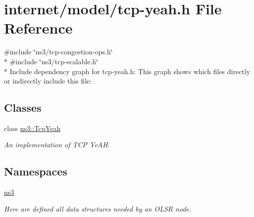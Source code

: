 \hypertarget{tcp-yeah_8h}{}\section{internet/model/tcp-\/yeah.h File Reference}
\label{tcp-yeah_8h}
{\ttfamily \#include \char`\"{}ns3/tcp-\/congestion-\/ops.\+h\char`\"{}}\\*
{\ttfamily \#include \char`\"{}ns3/tcp-\/scalable.\+h\char`\"{}}\\*
Include dependency graph for tcp-\/yeah.h\+:
This graph shows which files directly or indirectly include this file\+:
\subsection*{Classes}
\begin{DoxyCompactItemize}
\item 
class \hyperlink{classns3_1_1TcpYeah}{ns3\+::\+Tcp\+Yeah}
\begin{DoxyCompactList}\small\item\em An implementation of T\+CP Ye\+AH. \end{DoxyCompactList}\end{DoxyCompactItemize}
\subsection*{Namespaces}
\begin{DoxyCompactItemize}
\item 
 \hyperlink{namespacens3}{ns3}
\begin{DoxyCompactList}\small\item\em Here are defined all data structures needed by an O\+L\+SR node. \end{DoxyCompactList}\end{DoxyCompactItemize}
